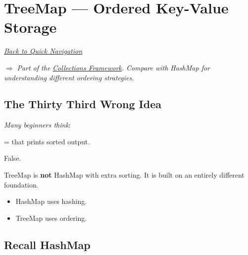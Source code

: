 \documentclass[11pt,a4paper]{book}
\begin{document}
\chapter{TreeMap --- Ordered Key-Value Storage}

\smallskip
\noindent
\hyperref[sec:quick_nav]{\emph{Back to Quick Navigation}}

\smallskip
\noindent
\textcolor{RosettaRoyalPurple}{$\Rightarrow$}
\emph{Part of the \hyperref[chap:collections]{Collections Framework}. Compare with HashMap for understanding different ordering strategies.}


\section{The Thirty Third Wrong Idea}

\begin{trap}

\emph{Many beginners think}:

{ = } 
that prints sorted output.


\textcolor{RosettaOrange}{False}.


TreeMap is \textbf{not} HashMap
with extra sorting.
It is built on an entirely
different foundation.


\begin{itemize}
    \item[*]\textcolor{RosettaJade}{HashMap} uses \textcolor{RosettaRoyalPurple}{hashing}.
    \item[*]\textcolor{RosettaJade}{TreeMap} uses \textcolor{RosettaOrange}{ordering}.
\end{itemize}
\end{trap}


\section{Recall HashMap}
\end{document}
